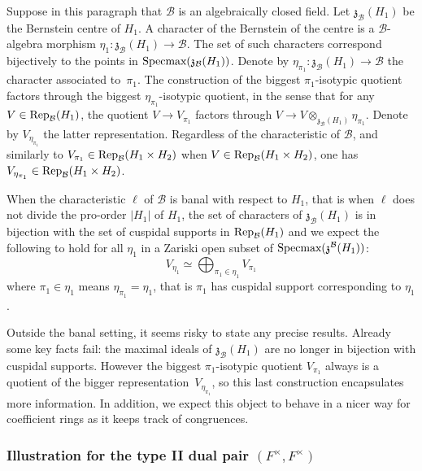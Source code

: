 \documentclass[11pt]{article}
\theoremstyle{plain}
\theoremstyle{definition}
\theoremstyle{plain}
\theoremstyle{definition}
\theoremstyle{plain}
\begin{document}
Suppose in this paragraph that $\mathcal{B}$ is an algebraically closed field. Let $\mathfrak{z}_\mathcal{B}(H_1)$ be the Bernstein centre of $H_1$. A character of the Bernstein of the centre is a $\mathcal{B}$-algebra morphism $\eta_1 : \mathfrak{z}_\mathcal{B}(H_1) \to \mathcal{B}$. The set of such characters correspond bijectively to the points in $\textup{Specmax}(\mathfrak{z}_\mathcal{B}(H_1))$. Denote by
$\eta_{\pi_1} : \mathfrak{z}_\mathcal{B}(H_1) \to \mathcal{B}$ the character associated to~$\pi_1$. The construction of the biggest $\pi_1$-isotypic quotient factors through the biggest $\eta_{\pi_1}$-isotypic quotient, in the sense that for any $V \in \textup{Rep}_\mathcal{B}(H_1)$, the quotient $V \to V_{\pi_1}$ factors through $V \to V \otimes_{\mathfrak{z}_\mathcal{B}(H_1)} \eta_{\pi_1}$. Denote by $V_{\eta_{\pi_1}}$ the latter representation.  Regardless of the characteristic of $\mathcal{B}$, and similarly to $V_{\pi_1} \in \textup{Rep}_\mathcal{B}(H_1 \times H_2)$ when $V \in \textup{Rep}_\mathcal{B}(H_1 \times H_2)$, one has $V_{\eta_{\pi_1}} \in \textup{Rep}_\mathcal{B}(H_1\times H_2)$.

When the characteristic $\ell$ of $\mathcal{B}$ is banal with respect to $H_1$, that is when $\ell$ does not divide the pro-order $|H_1|$ of $H_1$, the set of characters of $\mathfrak{z}_\mathcal{B}(H_1)$ is in bijection with the set of cuspidal supports in $\textup{Rep}_\mathcal{B}(H_1)$ and  we expect the following to hold for all $\eta_1$ in a Zariski open subset of $\textup{Specmax}(\mathfrak{z}^\mathcal{B}(H_1))$:
$$V_{\eta_1} \simeq \bigoplus_{\pi_1 \in \eta_1} V_{\pi_1}$$
where $\pi_1 \in \eta_1$ means $\eta_{\pi_1}=\eta_1$, that is $\pi_1$ has cuspidal support corresponding to $\eta_1$.

Outside the banal setting, it seems risky to state any precise results. Already some key facts fail: the maximal ideals of $\mathfrak{z}_\mathcal{B}(H_1)$ are no longer in bijection with cuspidal supports. However the biggest $\pi_1$-isotypic quotient $V_{\pi_1}$ always is a quotient of the bigger representation~$V_{\eta_{\pi_1}}$, so this last construction encapsulates more information. In addition, we expect this object to behave in a nicer way for coefficient rings as it keeps track of congruences.


\subsubsection*{Illustration for the type II dual pair $(F^\times,F^\times)$}
\end{document}
